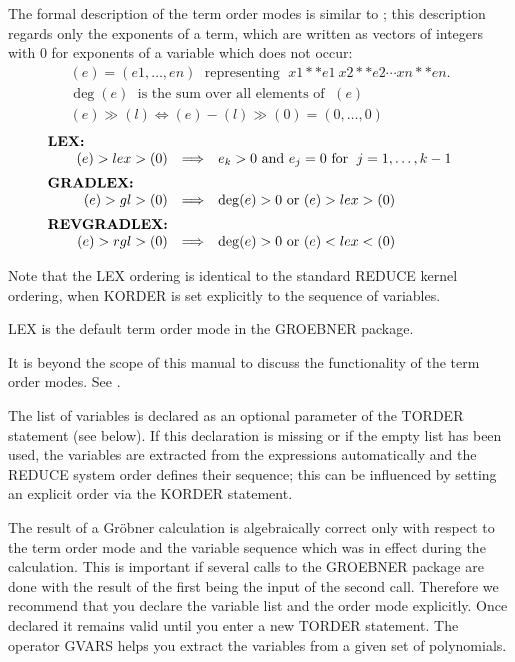 The formal description of the term order modes is similar to
\cite{Kredel:88}; this description regards only the exponents of a term,
which are written as vectors of integers with $0$ for exponents of a
variable which does not occur:
\[
\begin{array}{l}
  (e) = (e1,\ldots , en) \;\mbox{ representing }\; x1**e1 \ x2**e2 \cdots
  xn**en. \\
  \deg(e) \; \mbox{ is the sum over all elements of } \;(e) \\
  (e) \gg (l) \Longleftrightarrow (e)-(l)\gg (0) = (0,\ldots ,0)
\end{array}
\]
\[
\begin{array}{rll}
\multicolumn{1}{l}{\hspace*{-.5cm}\mbox{\bf LEX:}} \\
  (e) > lex > (0) & \Longrightarrow  & e_k > 0 \mbox{ and } e_j =0
\mbox{ for }\; j=1,\ldots , k-1\vspace*{2mm} \\
\multicolumn{1}{l}{\hspace*{-.5cm}\mbox{\bf
GRADLEX:}} \\
  (e) >gl> (0)  & \Longrightarrow  & \deg(e)>0  \mbox { or } (e) >lex>
(0)\vspace*{2mm} \\
\multicolumn{1}{l}{\hspace*{-.5cm}\mbox{\bf
REVGRADLEX:}}\\
  (e) >rgl> (0) & \Longrightarrow & \deg(e)>0  \mbox{ or }(e)  <lex<
(0)
\end{array}
\]

Note that the LEX ordering is identical to the standard REDUCE
kernel ordering, when KORDER is set explicitly to the sequence of
variables.

LEX is the default term order mode in the GROEBNER package.

It is beyond the scope of this manual to discuss the functionality of
the term order modes. See \cite{Buchberger:88}.

The list of variables is declared as an optional parameter of the
TORDER statement (see below). If this declaration is missing
or if the empty list has been used, the variables are extracted from
the expressions automatically and the REDUCE system order defines
their sequence; this can be influenced by setting an explicit order
via the KORDER statement.

The result of a Gr\"obner calculation is algebraically correct only
with respect to the term order mode and the variable sequence
which was in effect during the calculation. This is important if
several calls to the GROEBNER package are done with the result of the
first being the input of the second call. Therefore we recommend
that you declare the variable list and the order mode explicitly.
Once declared it remains valid until you enter a new TORDER
statement. The operator GVARS helps you extract the variables
from a given set of polynomials.

